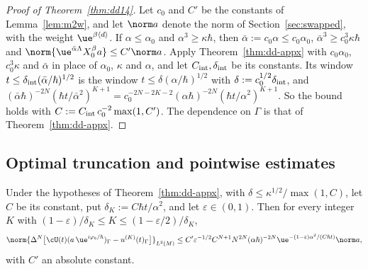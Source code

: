 \begin{proof}[Proof of Theorem~\ref{thm:dd14}]
Let $c_0$ and $C'$ be the constants of Lemma~\ref{lem:m2w}, and let $\norm a$ denote the norm of Section~\ref{sec:swapped}, with the weight
$\ue^{\beta\langle d\rangle}$. If $\alpha\le\alpha_0$ and $\alpha^3\ge\kappa\hbar$, then $\bar\alpha:=c_0\alpha\le c_0\alpha_0$,
$\bar\alpha^3\ge c_0^3\kappa\hbar$ and $\norm{\ue^{\bar\alpha\Lambda}X_0^\beta a}\le C'\norm a$. Apply Theorem~\ref{thm:dd-appx} with
$c_0\alpha_0$, $c_0^3\kappa$ and $\bar\alpha$ in place of $\alpha_0$, $\kappa$ and $\alpha$, and let $C_{\rm int},\delta_{\rm int}$ be its constants. Its
window $t\le\delta_{\rm int}(\bar\alpha/\hbar)^{1/2}$ is the window $t\le\delta(\alpha/\hbar)^{1/2}$ with $\delta:=c_0^{1/2}\delta_{\rm int}$, and
$(\bar\alpha\hbar)^{-2N}(\hbar t/\bar\alpha^2)^{K+1}=c_0^{-2N-2K-2}(\alpha\hbar)^{-2N}(\hbar t/\alpha^2)^{K+1}$. So the bound holds with
$C:=C_{\rm int}\,c_0^{-2}\max(1,C')$. The dependence on $\Gamma$ is that of Theorem~\ref{thm:dd-appx}.
\end{proof}

\subsection{Optimal truncation and pointwise estimates}\label{subsec:dd-cor}

\begin{corollary}\label{cor:dd15-appx}
Under the hypotheses of Theorem~\ref{thm:dd-appx}, with $\delta\le\kappa^{1/2}/\max(1,C)$, let $C$ be its constant, put $\delta_K:=C\hbar t/\alpha^2$, and let $\varepsilon\in(0,1)$. Then for every integer $K$ with $(1-\varepsilon)/\delta_K\le K\le(1-\varepsilon/2)/\delta_K$,
\[
\norm{\Delta^N\bigl[\cU(t)(a\,\ue^{i\varphi_b/\hbar})_\Gamma-u^{(K)}(t)_\Gamma\bigr]}_{L^2(M)}\le C'\varepsilon^{-1/2}C^{N+1}N^{2N}(\alpha\hbar)^{-2N}\ue^{-(1-\varepsilon)\alpha^2/(C\hbar t)}\norm a,
\]
with $C'$ an absolute constant.
\end{corollary}

